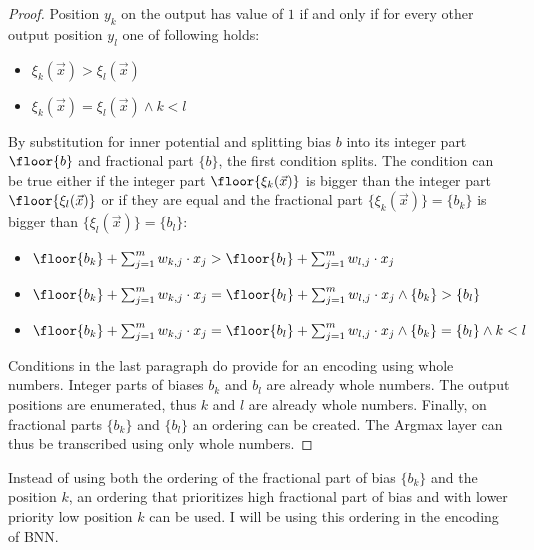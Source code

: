 \begin{lemma}
\begin{proof}
        Position $y_k$ on the output has value of $1$ if and only if
        for every other output position $y_l$ one of following holds:
        \begin{itemize}
            \item $\xi_k(\vec x) > \xi_l(\vec x)$
            \item $\xi_k(\vec x) = \xi_l(\vec x) \wedge k < l$
        \end{itemize}
        By substitution for inner potential and splitting bias $b$ into its
        integer part $\floor{b}$ and fractional part $\{b\}$, the first condition splits.
        The condition can be true either if the integer part $\floor{\xi_k(\vec x)}$
        is bigger than the integer part $\floor{\xi_l(\vec x)}$
        or if they are equal and the fractional part $\{\xi_k(\vec x)\} = \{b_k\}$
        is bigger than $\{\xi_l(\vec x)\} = \{b_l\}$:
        \begin{itemize}
            \item $\floor{b_k} + \sum_{j=1}^m w_{k, j} \cdot x_j > \floor{b_l} + \sum_{j=1}^m w_{l, j} \cdot x_j$
            \item $\floor{b_k} + \sum_{j=1}^m w_{k, j} \cdot x_j = \floor{b_l} + \sum_{j=1}^m w_{l, j} \cdot x_j
                \wedge \{b_k\} > \{b_l\}$
            \item $\floor{b_k} + \sum_{j=1}^m w_{k, j} \cdot x_j = \floor{b_l} + \sum_{j=1}^m w_{l, j} \cdot x_j
                \wedge \{b_k\} = \{b_l\} \wedge k < l$
        \end{itemize}

        Conditions in the last paragraph do provide for an encoding using whole numbers.
        Integer parts of biases $b_k$ and $b_l$ are already whole numbers.
        The output positions are enumerated, thus $k$ and $l$ are already whole numbers.
        Finally, on fractional parts $\{b_k\}$ and $\{b_l\}$ an ordering
        can be created. The Argmax layer can thus be transcribed using only whole numbers.
    \end{proof}

    \begin{remark}
        Instead of using both the ordering of the fractional part of bias $\{b_k\}$
        and the position $k$, an ordering that prioritizes high fractional part of bias 
        and with lower priority low position $k$ can be used.
        I will be using this ordering in the encoding of BNN.%
    \end{remark}
\end{lemma}

